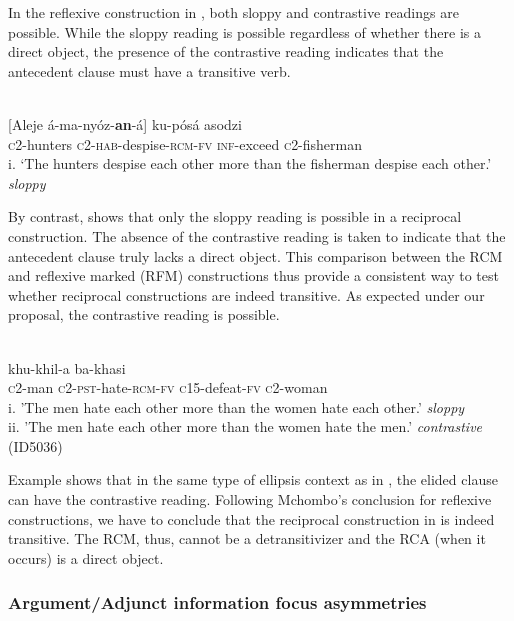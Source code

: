 \documentclass[output=paper]{langsci/langscibook}
\begin{document}
In the reflexive construction in , both sloppy and contrastive readings are possible. While the sloppy reading is possible regardless of whether there is a direct object, the presence of the contrastive reading indicates that the antecedent clause must have a transitive verb. 


\ea\label{ex:safir:12}
  \\
\gll {}[Aleje     á-ma-nyóz-\textbf{an}-á]    ku-pósá   asodzi \\
{\db}\textsc{c}2-hunters   \textsc{c2-hab}-despise-\textsc{rcm}\textsc{-fv}     \textsc{inf}-exceed   \textsc{c}2-fisherman \\
\glt
i. ‘The hunters despise each other more than the fisherman despise each other.'  \textit{sloppy}  
\z


By contrast,  shows that only the sloppy reading is possible in a  reciprocal construction. The absence of the contrastive reading is taken to indicate that the antecedent clause truly lacks a direct object. This comparison between the  RCM and reflexive marked (RFM) constructions thus provide a consistent way to test whether  reciprocal constructions are indeed transitive. As expected under our proposal, the contrastive reading is possible.


\ea\label{ex:safir:13}
\\
   khu-khil-a   ba-khasi \\
{\db}\textsc{c}2-man   \textsc{c2-pst}-hate-\textsc{rcm}\textsc{-fv}   \textsc{c}15-defeat-\textsc{fv}   \textsc{c}2-woman  \\
\glt i. 'The men hate each other more than the women hate each other.'  \textit{sloppy} \\
\glt ii. 'The men hate each other more than the women hate the men.'  \textit{contrastive}                       (ID5036)\\
\z

Example  shows that in the same type of ellipsis context as in , the elided clause can have the contrastive reading. Following Mchombo's conclusion for  reflexive constructions, we have to conclude that the reciprocal construction in  is indeed transitive. The RCM, thus, cannot be a detransitivizer and the RCA (when it occurs) is a direct object.

\subsubsection{Argument/Adjunct information focus asymmetries}
\end{document}
